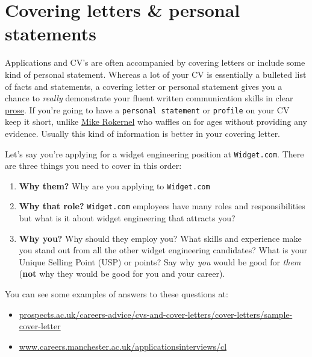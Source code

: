 \documentclass[
]{book}
\providecommand{\tightlist}{%
  \setlength{\itemsep}{0pt}\setlength{\parskip}{0pt}}
\begin{document}
\hypertarget{we3qs}{%
\section{Covering letters \& personal statements}\label{we3qs}}

Applications and CV's are often accompanied by covering letters or include some kind of personal statement. Whereas a lot of your CV is essentially a bulleted list of facts and statements, a covering letter or personal statement gives you a chance to \emph{really} demonstrate your fluent written communication skills in clear \href{https://en.wikipedia.org/wiki/Prose}{prose}. If you're going to have a \texttt{personal\ statement} or \texttt{profile} on your CV keep it short, unlike \href{https://www.cdyf.me/mike_rokernel.pdf}{Mike Rokernel} who waffles on for ages without providing any evidence. Usually this kind of information is better in your covering letter.

Let's say you're applying for a widget engineering position at \texttt{Widget.com}. There are three things you need to cover in this order:

\begin{enumerate}
\def\labelenumi{\arabic{enumi}.}
\tightlist
\item
  \textbf{Why them?} Why are you applying to \texttt{Widget.com}
\item
  \textbf{Why that role?} \texttt{Widget.com} employees have many roles and responsibilities but what is it about widget engineering that attracts you?
\item
  \textbf{Why you?} Why should they employ you? What skills and experience make you stand out from all the other widget engineering candidates? What is your Unique Selling Point (USP) or points? Say why \emph{you} would be good for \emph{them} (\textbf{not} why they would be good for you and your career).
\end{enumerate}

You can see some examples of answers to these questions at:

\begin{itemize}
\tightlist
\item
  \href{https://www.prospects.ac.uk/careers-advice/cvs-and-cover-letters/cover-letters/sample-cover-letter}{prospects.ac.uk/careers-advice/cvs-and-cover-letters/cover-letters/sample-cover-letter}
\item
  \href{https://www.careers.manchester.ac.uk/applicationsinterviews/cl/}{www.careers.manchester.ac.uk/applicationsinterviews/cl}
\end{itemize}
\end{document}
